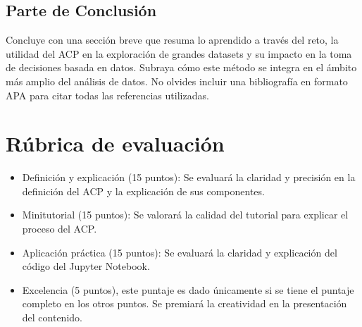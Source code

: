 \documentclass[a4,11pt]{aleph-notas}
\begin{document}
\subsection{Parte de Conclusión}

    Concluye con una sección breve que resuma lo aprendido a través del reto, la utilidad del ACP en la exploración de grandes datasets y su impacto en la toma de decisiones basada en datos. Subraya cómo este método se integra en el ámbito más amplio del análisis de datos. No olvides incluir una bibliografía en formato APA para citar todas las referencias utilizadas.

\section{Rúbrica de evaluación}

\begin{itemize}
\item
    Definición y explicación (15 puntos): Se evaluará la claridad y precisión en la definición del ACP y la explicación de sus componentes.
\item 
    Minitutorial (15 puntos): Se valorará la calidad del tutorial para explicar el proceso del ACP.
\item 
    Aplicación práctica (15 puntos): Se evaluará la claridad y explicación del código del Jupyter Notebook.

\item
    Excelencia (5 puntos), este puntaje es dado únicamente si se tiene el puntaje completo en los otros puntos. Se premiará la creatividad en la presentación del contenido.
\end{itemize}
\end{document}
